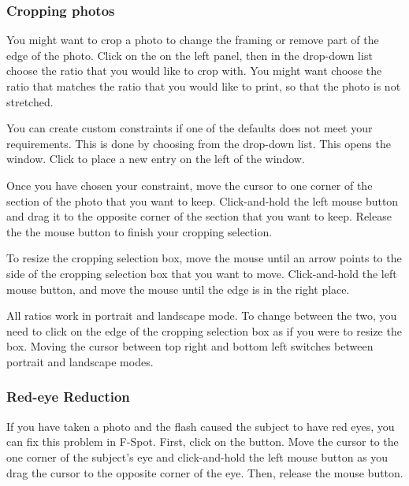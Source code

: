\subsubsection{Cropping photos} 

You might want to crop a photo to change the framing or remove part of the edge 
of the photo. Click on the  on the left panel, then in the 
 drop-down list choose the ratio that you 
would like to crop with. You might want choose the ratio that matches the ratio 
that you would like to print, so that the photo is not stretched.

You can create custom constraints if one of the defaults does not meet your 
requirements. This is done by choosing  from the 
 drop-down list. This opens the 
 window. Click  to place a new entry on 
the left of the window.

Once you have chosen your constraint, move the cursor to one corner of the 
section of the photo that you want to keep. Click-and-hold the left mouse button 
and drag it to the opposite corner of the section that you want to keep. 
Release the the mouse button to finish your cropping selection.

To resize the cropping selection box, move the mouse until an arrow points to 
the side of the cropping selection box that you want to move. Click-and-hold the 
left mouse button, and move the mouse until the edge is in the right place.

All ratios work in portrait and landscape mode. To change between the two, you 
need to click on the edge of the cropping selection box as if you were to resize 
the box. Moving the cursor between top right and bottom left switches between 
portrait and landscape modes.

\subsubsection{Red-eye Reduction} 

If you have taken a photo and the flash caused the subject to have 
red eyes, you can fix this problem in F-Spot. First, click on the 
 button. Move the cursor to the one corner of the 
subject's eye and click-and-hold the left mouse button as you drag the cursor to 
the opposite corner of the eye. Then, release the mouse button.

